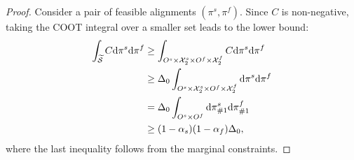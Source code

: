\begin{proof}
Consider a pair of feasible alignments $(\pi^s, \pi^f)$. Since $C$ is non-negative, taking the COOT integral over a smaller set leads to the lower bound:
\begin{equation}
    \begin{split}
        \int_{\widetilde{\mathcal S}} C \mathrm d\pi^s\mathrm d\pi^f
        &\geq \int_{O^s \times \mathcal X_2^s \times O^f \times \mathcal X_2^f} C \mathrm d\pi^s\mathrm d\pi^f \\
          &\geq  \Delta_0 \int_{O^s \times \mathcal X_2^s \times O^f \times \mathcal X_2^f}  \mathrm d\pi^s\mathrm d\pi^f \\
          &= \Delta_0 \int_{O^s\times O^f}  \mathrm d\pi^s_{\#1} \mathrm d\pi^f_{\#1} \\
          &\geq (1 - \alpha_s)(1 -\alpha_f)\Delta_0,
    \end{split}
\end{equation}
where the last inequality follows from the marginal constraints.
\end{proof}

